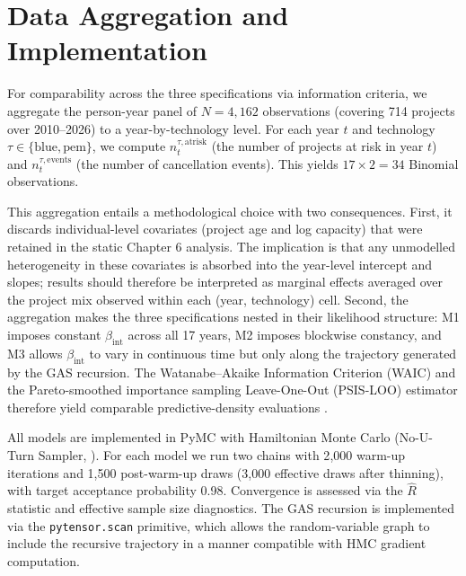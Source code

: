 \documentclass[11pt,a4paper]{article}
\newcommand{\bint}{\beta_{\mathrm{int}}}
\begin{document}
\section{Data Aggregation and Implementation}
\label{sec:ch7-data}

For comparability across the three specifications via information criteria, we aggregate the person-year panel of $N = 4{,}162$ observations (covering 714 projects over 2010--2026) to a year-by-technology level. For each year $t$ and technology $\tau \in \{\mathrm{blue}, \mathrm{pem}\}$, we compute $n_t^{\tau,\mathrm{atrisk}}$ (the number of projects at risk in year $t$) and $n_t^{\tau,\mathrm{events}}$ (the number of cancellation events). This yields $17 \times 2 = 34$ Binomial observations.

This aggregation entails a methodological choice with two consequences. First, it discards individual-level covariates (project age and log capacity) that were retained in the static Chapter 6 analysis. The implication is that any unmodelled heterogeneity in these covariates is absorbed into the year-level intercept and slopes; results should therefore be interpreted as marginal effects averaged over the project mix observed within each (year, technology) cell. Second, the aggregation makes the three specifications nested in their likelihood structure: M1 imposes constant $\bint$ across all 17 years, M2 imposes blockwise constancy, and M3 allows $\bint$ to vary in continuous time but only along the trajectory generated by the GAS recursion. The Watanabe--Akaike Information Criterion (WAIC) and the Pareto-smoothed importance sampling Leave-One-Out (PSIS-LOO) estimator therefore yield comparable predictive-density evaluations \citep{vehtari2017practical, watanabe2010asymptotic}.

All models are implemented in PyMC \citep{salvatier2016probabilistic} with Hamiltonian Monte Carlo (No-U-Turn Sampler, \citealt{hoffman2014no}). For each model we run two chains with 2{,}000 warm-up iterations and 1{,}500 post-warm-up draws (3{,}000 effective draws after thinning), with target acceptance probability 0.98. Convergence is assessed via the $\hat{R}$ statistic \citep{vehtari2021rank} and effective sample size diagnostics. The GAS recursion is implemented via the \texttt{pytensor.scan} primitive, which allows the random-variable graph to include the recursive trajectory in a manner compatible with HMC gradient computation.
\end{document}
